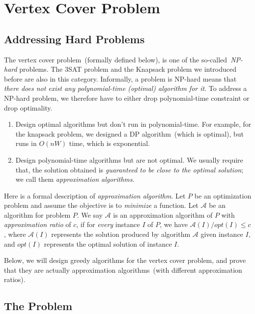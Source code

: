 \section{Vertex Cover Problem}

\subsection*{Addressing Hard Problems}

The vertex cover problem~(formally defined below), is one of the
so-called~\emph{NP-hard} problems.  The 3SAT problem and the Knapsack problem
we introduced before are also in this category.  Informally, a problem is
{NP-hard} means that \emph{there does not exist any polynomial-time (optimal)
algorithm for it}. To address a NP-hard problem, we therefore have to either
drop polynomial-time constraint or drop optimality.

\vspace*{-\topsep}
\begin{enumerate}
\item Design optimal algorithms but don't run in polynomial-time.
For example, for the knapsack problem, we designed a DP algorithm~(which
is optimal), but runs in $O(nW)$ time, which is exponential.
\item Design polynomial-time algorithms but are not optimal.
We usually require that, the solution obtained is \emph{guaranteed
to be close to the optimal solution}; we call them \emph{approximation algorithms}.
\end{enumerate}

Here is a formal description of \emph{approximation algorithm}.
Let $P$ be an optimization problem and assume the objective
is to \emph{minimize} a function.
Let $\mathcal{A}$ be an algorithm for problem $P$. We say $\mathcal{A}$
is an approximation algorithm of $P$ with \emph{approximation ratio} of $c$, if for \emph{every} instance
$I$ of $P$, we have $\mathcal{A}(I) / opt(I) \le c$,
where $\mathcal{A}(I)$ represents the solution produced by algorithm $\mathcal{A}$ given instance $I$,
and $opt(I)$ represents the optimal solution of instance $I$.

Below, we will design greedy algorithms for the vertex cover problem, and
prove that they are actually approximation algorithms~(with different approximation ratios).

\subsection*{The Problem}

